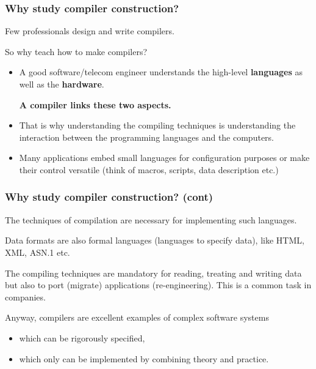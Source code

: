 
% 
\begin{frame}
\frametitle{Why study compiler construction?}

Few professionals design and write compilers.

\bigskip

So why teach how to make compilers?
\begin{itemize}

  \item A good software/telecom engineer understands the high-level
  \textbf{languages} as well as the \textbf{hardware}.

  \textbf{A compiler links these two aspects.}

  \item That is why understanding the compiling techniques is
  understanding the interaction between the programming languages and
  the computers.

  \item Many applications embed small languages for configuration
  purposes or make their control versatile (think of macros, scripts,
  data description etc.)

\end{itemize}

\end{frame}

% 
\begin{frame}
\frametitle{Why study compiler construction? (cont)}

The techniques of compilation are necessary for implementing such
languages.

\bigskip

Data formats are also formal languages (languages to specify data),
like HTML, XML, ASN.1 etc.

\bigskip

The compiling techniques are mandatory for reading, treating and
writing data but also to port (migrate) applications
(re-engineering). This is a common task in companies.

\bigskip

Anyway, compilers are excellent examples of complex software systems
\begin{itemize}

  \item which can be rigorously specified,

  \item which only can be implemented by combining theory and
  practice.

\end{itemize}

\end{frame}

